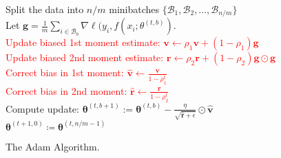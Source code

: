 \documentclass[12pt,a4paper]{article}
\begin{document}
\begin{algorithm}[H]


    {   
        Split the data into $n/m$ minibatches $\{\mathcal{B}_1, \mathcal{B}_2, \ldots, \mathcal{B}_{n/m}\}$\\
        {
            Let $\boldsymbol{g} = \frac{1}{m} \sum_{i \in \mathcal{B}_b} \nabla \ell(y_i, f(x_i; \theta^{(t, b)})$.\\
            \textcolor{red}{Update biased 1st moment estimate: $\boldsymbol{v} \leftarrow \rho_1\boldsymbol{v} + (1 - \rho_1)\boldsymbol{g}$}\\
            \textcolor{red}{Update biased 2nd moment estimate: $\boldsymbol{r} \leftarrow \rho_2\boldsymbol{r} + (1 - \rho_2)\boldsymbol{g} \odot \boldsymbol{g}$}\\
            \textcolor{red}{Correct bias in 1st moment: $\hat{\boldsymbol{v}} \leftarrow \frac{\boldsymbol{v}}{1 - \rho_1^t}$}\\
            \textcolor{red}{Correct bias in 2nd moment: $\hat{\boldsymbol{r}} \leftarrow \frac{\boldsymbol{r}}{1 - \rho_2^t}$}\\
            Compute update: $\boldsymbol{\theta}^{(t, b+1)} := \boldsymbol{\theta}^{(t, b)} - \frac{\eta}{\sqrt{\hat{\boldsymbol{r}} + \epsilon}} \odot \hat{\boldsymbol{v}}$\\
        }
        $\boldsymbol{\theta}^{(t+1, 0)} \coloneqq \boldsymbol{\theta}^{(t, n/m-1)}$\\
    }

	\caption{The Adam Algorithm.}
\end{algorithm}
\end{document}
